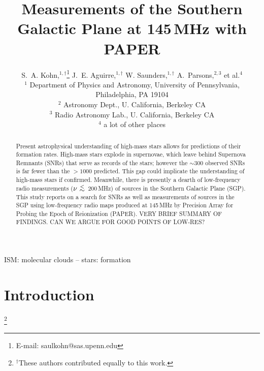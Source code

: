 \documentclass[useAMS,usenatbib]{mn2e}
\title[The SGP at 145\,MHz with PAPER]{Measurements of the Southern Galactic Plane at 145\,MHz with PAPER}
\author[S. A. Kohn et al.]{S.~A. Kohn,$^{1,\dagger}$\thanks{E-mail: saulkohn@sas.upenn.edu} J.~E. Aguirre,$^{1,\dagger}$ W. Saunders,$^{1,\dagger}$
A.~Parsons,$^{2,3}$
\newauthor et al.$^4$\\
$^{1}$ Department of Physics and Astronomy, University of Pennsylvania, Philadelphia, PA 19104\\
$^{2}$ Astronomy Dept., U. California, Berkeley CA\\
$^{3}$ Radio Astronomy Lab., U. California, Berkeley CA\\
$^{4}$ a lot of other places\\
}
\newcommand {\aplt} {\ {\raise-.5ex\hbox{$\buildrel<\over\sim$}}\ }
\begin{document}
\date{}

\maketitle
\begin{abstract}
Present astrophysical understanding of high-mass stars allows for predictions of their formation rates.  High-mass stars explode in supernovae, which leave behind Supernova Remnants (SNRs) that serve as records of the stars; however the $\sim$300 observed SNRs is far fewer than the $>1000$ predicted.  This gap could implicate the understanding of high-mass stars if confirmed. 
Meanwhile, there is presently a dearth of low-frequency radio measurements ($\nu\aplt$200\,MHz) of sources in the Southern Galactic Plane (SGP).
This study reports on a search for SNRs as well as measurements of sources in the SGP using low-frequency radio maps produced at 145\,MHz by Precision Array for Probing the Epoch of Reionization (PAPER).
{\color{red} VERY BRIEF SUMMARY OF FINDINGS.}
{\color{blue} CAN WE ARGUE FOR GOOD POINTS OF LOW-RES?}
\end{abstract}

\begin{keywords}
ISM: molecular clouds -- stars: formation
\end{keywords}

\section{Introduction}
\let\thefootnote\relax\footnote{$^{\dagger}$These authors contributed equally to this work.}
\end{document}
